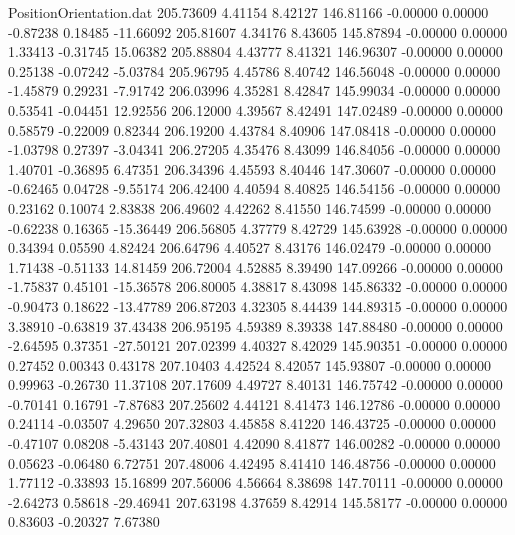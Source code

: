 \begin{filecontents}{PositionOrientation.dat}
 205.73609    4.41154    8.42127   146.81166   -0.00000    0.00000   -0.87238    0.18485  -11.66092
 205.81607    4.34176    8.43605   145.87894   -0.00000    0.00000    1.33413   -0.31745   15.06382
 205.88804    4.43777    8.41321   146.96307   -0.00000    0.00000    0.25138   -0.07242   -5.03784
 205.96795    4.45786    8.40742   146.56048   -0.00000    0.00000   -1.45879    0.29231   -7.91742
 206.03996    4.35281    8.42847   145.99034   -0.00000    0.00000    0.53541   -0.04451   12.92556
 206.12000    4.39567    8.42491   147.02489   -0.00000    0.00000    0.58579   -0.22009    0.82344
 206.19200    4.43784    8.40906   147.08418   -0.00000    0.00000   -1.03798    0.27397   -3.04341
 206.27205    4.35476    8.43099   146.84056   -0.00000    0.00000    1.40701   -0.36895    6.47351
 206.34396    4.45593    8.40446   147.30607   -0.00000    0.00000   -0.62465    0.04728   -9.55174
 206.42400    4.40594    8.40825   146.54156   -0.00000    0.00000    0.23162    0.10074    2.83838
 206.49602    4.42262    8.41550   146.74599   -0.00000    0.00000   -0.62238    0.16365  -15.36449
 206.56805    4.37779    8.42729   145.63928   -0.00000    0.00000    0.34394    0.05590    4.82424
 206.64796    4.40527    8.43176   146.02479   -0.00000    0.00000    1.71438   -0.51133   14.81459
 206.72004    4.52885    8.39490   147.09266   -0.00000    0.00000   -1.75837    0.45101  -15.36578
 206.80005    4.38817    8.43098   145.86332   -0.00000    0.00000   -0.90473    0.18622  -13.47789
 206.87203    4.32305    8.44439   144.89315   -0.00000    0.00000    3.38910   -0.63819   37.43438
 206.95195    4.59389    8.39338   147.88480   -0.00000    0.00000   -2.64595    0.37351  -27.50121
 207.02399    4.40327    8.42029   145.90351   -0.00000    0.00000    0.27452    0.00343    0.43178
 207.10403    4.42524    8.42057   145.93807   -0.00000    0.00000    0.99963   -0.26730   11.37108
 207.17609    4.49727    8.40131   146.75742   -0.00000    0.00000   -0.70141    0.16791   -7.87683
 207.25602    4.44121    8.41473   146.12786   -0.00000    0.00000    0.24114   -0.03507    4.29650
 207.32803    4.45858    8.41220   146.43725   -0.00000    0.00000   -0.47107    0.08208   -5.43143
 207.40801    4.42090    8.41877   146.00282   -0.00000    0.00000    0.05623   -0.06480    6.72751
 207.48006    4.42495    8.41410   146.48756   -0.00000    0.00000    1.77112   -0.33893   15.16899
 207.56006    4.56664    8.38698   147.70111   -0.00000    0.00000   -2.64273    0.58618  -29.46941
 207.63198    4.37659    8.42914   145.58177   -0.00000    0.00000    0.83603   -0.20327    7.67380

\end{filecontents}
